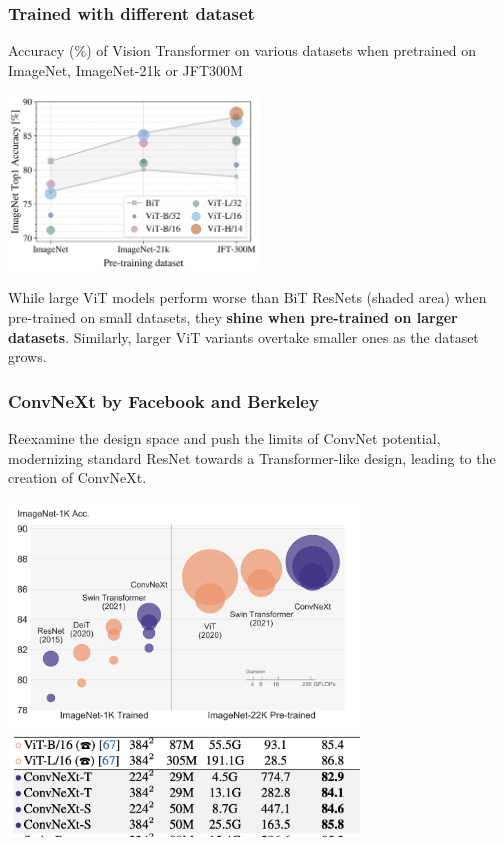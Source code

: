 \begin{frame}
\frametitle{Trained with different dataset}
Accuracy (\%) of Vision Transformer on various datasets when pretrained on ImageNet, ImageNet-21k or JFT300M
\begin{center}
    \includegraphics[width=0.5\textwidth]{img/3-section/Pretraining image.png} 
\end{center}
While large ViT models perform worse than BiT ResNets (shaded area) when pre-trained on small datasets, they \textbf{shine when pre-trained on larger datasets}. Similarly, larger ViT variants overtake smaller ones as the dataset grows.

\end{frame}


\begin{frame}
\frametitle{ConvNeXt by Facebook and Berkeley}
Reexamine the design space and push the limits of ConvNet potential, modernizing  standard ResNet towards a Transformer-like design, leading to the creation of ConvNeXt.

\begin{center}
    \includegraphics[width=0.7\textwidth]{img/3-section/ConvNext.png} 
    \includegraphics[width=0.7\textwidth]{img/3-section/ConvNext2.png}
\end{center}

\end{frame}

